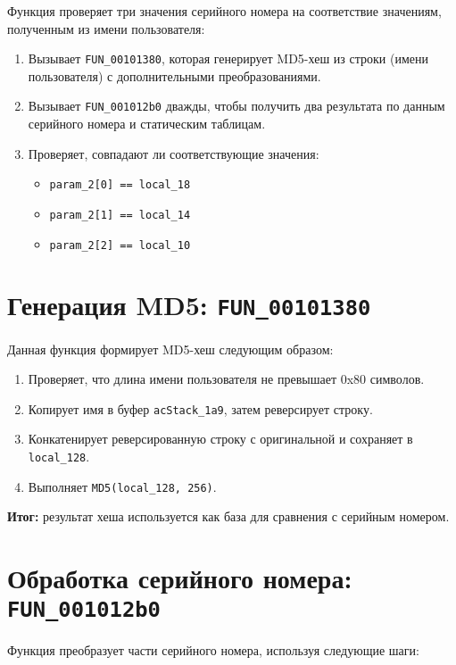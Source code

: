     Функция проверяет три значения серийного номера на соответствие значениям, полученным из имени пользователя:

    \begin{enumerate}
        \item Вызывает \texttt{FUN\_00101380}, которая генерирует MD5-хеш из строки (имени пользователя) с дополнительными преобразованиями.
        \item Вызывает \texttt{FUN\_001012b0} дважды, чтобы получить два результата по данным серийного номера и статическим таблицам.
        \item Проверяет, совпадают ли соответствующие значения:
        \begin{itemize}
            \item \texttt{param\_2[0] == local\_18}
            \item \texttt{param\_2[1] == local\_14}
            \item \texttt{param\_2[2] == local\_10}
        \end{itemize}
    \end{enumerate}


    \section{Генерация MD5: \texttt{FUN\_00101380}}

    Данная функция формирует MD5-хеш следующим образом:

    \begin{enumerate}
        \item Проверяет, что длина имени пользователя не превышает 0x80 символов.
        \item Копирует имя в буфер \texttt{acStack\_1a9}, затем реверсирует строку.
        \item Конкатенирует реверсированную строку с оригинальной и сохраняет в \texttt{local\_128}.
        \item Выполняет \texttt{MD5(local\_128, 256)}.
    \end{enumerate}

    \textbf{Итог:} результат хеша используется как база для сравнения с серийным номером.


    \section{Обработка серийного номера: \texttt{FUN\_001012b0}}

    Функция преобразует части серийного номера, используя следующие шаги:

